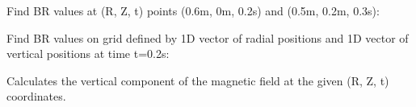 \documentclass[letterpaper,10pt,english]{sphinxmanual}
\begin{document}
\begin{fulllineitems}
\begin{fulllineitems}
Find BR values at (R, Z, t) points (0.6m, 0m, 0.2s) and
(0.5m, 0.2m, 0.3s):

\begin{sphinxVerbatim}[commandchars=\\\{\}]
  \PYG{p}{[} \PYG{p}{]} \PYG{p}{[} \PYG{p}{]} \PYG{p}{[} \PYG{p}{]} 
\end{sphinxVerbatim}

Find BR values on grid defined by 1D vector of radial positions 
and 1D vector of vertical positions  at time t=0.2s:

\begin{sphinxVerbatim}[commandchars=\\\{\}]
     
\end{sphinxVerbatim}

\end{fulllineitems}


\begin{fulllineitems}
\label{\detokenize{eqtools:eqtools.core.Equilibrium.rz2BZ}}
Calculates the vertical component of the magnetic field at the given (R, Z, t) coordinates.


\end{fulllineitems}
\end{fulllineitems}
\end{document}
